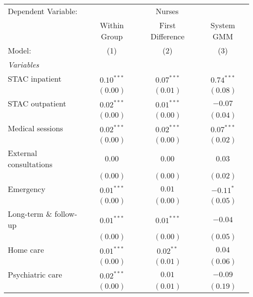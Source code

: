 
\begingroup
\centering
\begin{tabular}{lccc}
   \tabularnewline \midrule \midrule
   Dependent Variable:                 & \multicolumn{3}{c}{Nurses}                                   \\
                                       & Within Group               & First Difference & System GMM   \\
   Model:                              & (1)                        & (2)              & (3)          \\
   \midrule
   \emph{Variables}                                                                                   \\
   STAC inpatient                      & $0.10^{***}$               & $0.07^{***}$     & $0.74^{***}$ \\
                                       & $(0.00)$                   & $(0.01)$         & $(0.08)$     \\
   STAC outpatient                     & $0.02^{***}$               & $0.01^{***}$     & $-0.07$      \\
                                       & $(0.00)$                   & $(0.00)$         & $(0.04)$     \\
   Medical sessions                    & $0.02^{***}$               & $0.02^{***}$     & $0.07^{***}$ \\
                                       & $(0.00)$                   & $(0.00)$         & $(0.02)$     \\
   External consultations              & $0.00$                     & $0.00$           & $0.03$       \\
                                       & $(0.00)$                   & $(0.00)$         & $(0.02)$     \\
   Emergency                           & $0.01^{***}$               & $0.01$           & $-0.11^{*}$  \\
                                       & $(0.00)$                   & $(0.00)$         & $(0.05)$     \\
   Long-term              \& follow-up & $0.01^{***}$               & $0.01^{***}$     & $-0.04$      \\
                                       & $(0.00)$                   & $(0.00)$         & $(0.05)$     \\
   Home care                           & $0.01^{***}$               & $0.02^{**}$      & $0.04$       \\
                                       & $(0.00)$                   & $(0.01)$         & $(0.06)$     \\
   Psychiatric care                    & $0.02^{***}$               & $0.01$           & $-0.09$      \\
                                       & $(0.00)$                   & $(0.01)$         & $(0.19)$     \\
   \midrule


\end{tabular}
